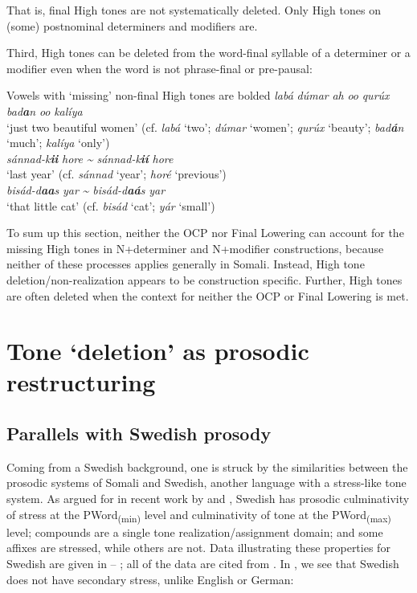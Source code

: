 \documentclass[output=paper]{langscibook}
\begin{document}
That is, final High tones are not systematically deleted. Only High tones on (some) postnominal determiners and modifiers are.

Third, High tones can be deleted from the word-final syllable of a determiner or a modifier even when the word is not phrase-final or pre-pausal:


\ea Vowels with ‘missing’ non-final High tones are bolded \label{ex:downing:12}
\ea  \textit{labá} \textit{dúmar} \textit{ah} \textit{oo} \textit{qurúx} \textit{bad}\textbf{\textit{a}}\textit{n} \textit{oo} \textit{kalíya} \\
  ‘just two beautiful women’ (cf. \textit{labá} ‘two’; \textit{dúmar} ‘women’;   \textit{qurúx} ‘beauty’; \textit{bad}\textbf{\textit{á}}\textit{n} ‘much’; \textit{kalíya} ‘only’)\\
\ex   \textit{sánnad-k}\textbf{\textit{ii}} \textit{hore} \textit{{\textasciitilde} sánnad-k}\textbf{\textit{ií}} \textit{hore} \\
  ‘last year’ (cf. \textit{sánnad} ‘year’; \textit{horé} ‘previous’)\\
\ex   \textit{bisád-d}\textbf{\textit{aa}}\textit{s} \textit{yar} \textit{{\textasciitilde} bisád-d}\textbf{\textit{aá}}\textit{s} \textit{yar} \\
  ‘that little cat’ (cf. \textit{bisád} ‘cat’; \textit{yár} ‘small’)\\
\z
\z

To sum up this section, neither the OCP nor Final Lowering can account for the missing High tones in N+determiner and N+modifier constructions, because neither of these processes applies generally in Somali. Instead, High tone deletion/non-realization appears to be construction specific. Further, High tones are often deleted when the context for neither the OCP or Final Lowering is met.


\section{Tone ‘deletion’ as prosodic restructuring}
\label{sec:downing:4}

\subsection{Parallels with Swedish prosody}


Coming from a Swedish background, one is struck by the similarities between the prosodic systems of Somali and Swedish, another language with a stress-like tone system. As argued for in recent work by \citet{Riad2012, Riad2016} and \citet{Myrberg2015}, Swedish has prosodic culminativity of stress at the PWord\textsubscript{(min)} level and culminativity of tone at the PWord\textsubscript{(max)} level; compounds are a single tone realization/assignment domain; and some affixes are stressed, while others are not. Data illustrating these properties for Swedish are given in  – ; all of the data are cited from \citet{Myrberg2015}. In , we see that Swedish does not have secondary stress, unlike English or German:
\end{document}
